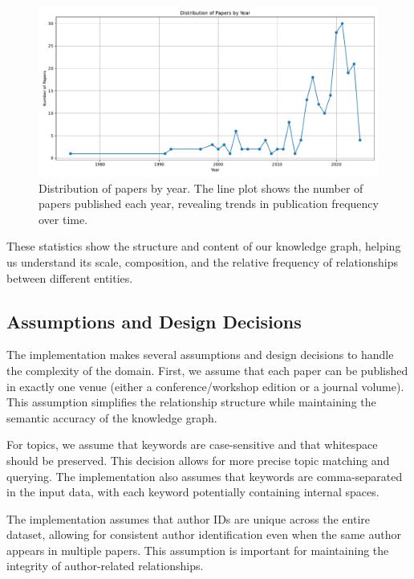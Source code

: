 \documentclass[10pt,a4paper]{article}
\begin{document}
\begin{figure}[H]
    \centering
    \includegraphics[width=\textwidth]{img/year_distribution.pdf}
    \caption{Distribution of papers by year. The line plot shows the number of papers published each year, revealing trends in publication frequency over time.}
    \label{fig:year_dist}
\end{figure}

These statistics show the structure and content of our knowledge graph, helping us understand its scale, composition, and the relative frequency of relationships between different entities.

\subsection{Assumptions and Design Decisions}

The implementation makes several assumptions and design decisions to handle the complexity of the domain. First, we assume that each paper can be published in exactly one venue (either a conference/workshop edition or a journal volume). This assumption simplifies the relationship structure while maintaining the semantic accuracy of the knowledge graph.

For topics, we assume that keywords are case-sensitive and that whitespace should be preserved. This decision allows for more precise topic matching and querying. The implementation also assumes that keywords are comma-separated in the input data, with each keyword potentially containing internal spaces.

The implementation assumes that author IDs are unique across the entire dataset, allowing for consistent author identification even when the same author appears in multiple papers. This assumption is important for maintaining the integrity of author-related relationships.
\end{document}
